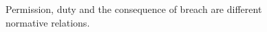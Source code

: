 \begin{figure}[H]
\centering
{}
\caption{Permission, duty and the consequence of breach are different normative relations.}\label{fig:teach-P-02a-foundations-00}
\end{figure}
